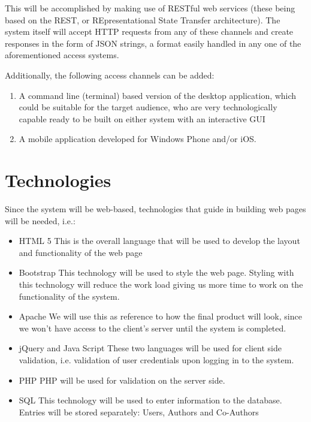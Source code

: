 \documentclass[hidelinks,a4paper,12pt]{article}
\begin{document}
	\begin{flushleft}
		This will be accomplished by making use of RESTful web services (these being based on the REST, or REpresentational State Transfer architecture). The system itself will accept HTTP requests from any of these channels
		and create responses in the form of JSON strings, a format easily handled in any one of the aforementioned access
		systems.
		
		Additionally, the following access channels can be added:
	\end{flushleft}
	
	\begin{enumerate}
		\item A command line (terminal) based version of the desktop application, which could be suitable for the target
		audience, who are very technologically capable
		ready to be built on either system with an interactive GUI
		\item A mobile application developed for Windows Phone and/or iOS.
	\end{enumerate}

\section{Technologies}
	Since the system will be web-based, technologies that guide in building web pages will be needed, i.e.:
	
	\begin{itemize} 
		\item HTML 5
		\newline
		This is the overall language that will be used to develop the layout and functionality of the web page
		\item Bootstrap
		\newline
		This technology will be used to style the web page. Styling with this technology will reduce the work load giving us more time to work on the 				functionality of the system.
		\item Apache
		\newline
		We will use this as reference to how the final product will look, since we won’t have access to the client’s server until the system is completed.	
		\item jQuery and Java Script
		\newline
		These two languages will be used for client side validation, i.e. validation of user credentials upon logging in to the system.	
		\item PHP
		\newline
		PHP will be used for validation on the server side.	
		\item SQL
		\newline  
		This technology will be used to enter information to the database. Entries will be stored separately:
		Users,
		Authors and Co-Authors
	\end{itemize}
	
\end{document}
